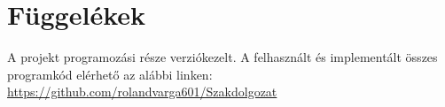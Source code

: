 \documentclass[../documentation.tex]{subfiles}
\begin{document}
\section{Függelékek}
A projekt programozási része verziókezelt. A felhasznált és implementált összes programkód elérhető az alábbi linken:\\
\url{https://github.com/rolandvarga601/Szakdolgozat}
\end{document}

